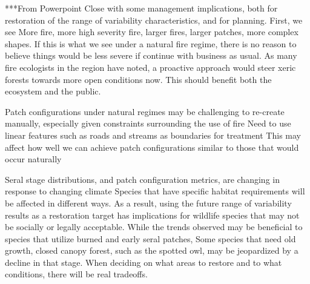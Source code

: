 ***From Powerpoint
Close with some management implications, both for restoration of the range of variability characteristics, and for planning.
First, we see More fire, more high severity fire, larger fires, larger patches, more complex shapes.
If this is what we see under a natural fire regime, there is no reason to believe things would be less severe if continue with business as usual.
As many fire ecologists in the region have noted, a proactive approach would steer xeric forests towards more open conditions now. 
This should benefit both the ecosystem and the public.

Patch configurations under natural regimes may be challenging to re-create manually, especially given constraints surrounding the use of fire
Need to use linear features such as roads and streams as boundaries for treatment
This may affect how well we can achieve patch configurations similar to those that would occur naturally

Seral stage distributions, and patch configuration metrics, are changing in response to changing climate
Species that have specific habitat requirements will be affected in different ways.
As a result, using the future range of variability results as a restoration target has implications for wildlife species that may not be socially or legally acceptable.
While the trends observed may be beneficial to species that utilize burned and early seral patches, 
Some species that need old growth, closed canopy forest, such as the spotted owl, may be jeopardized by a decline in that stage.
When deciding on what areas to restore and to what conditions, there will be real tradeoffs.


